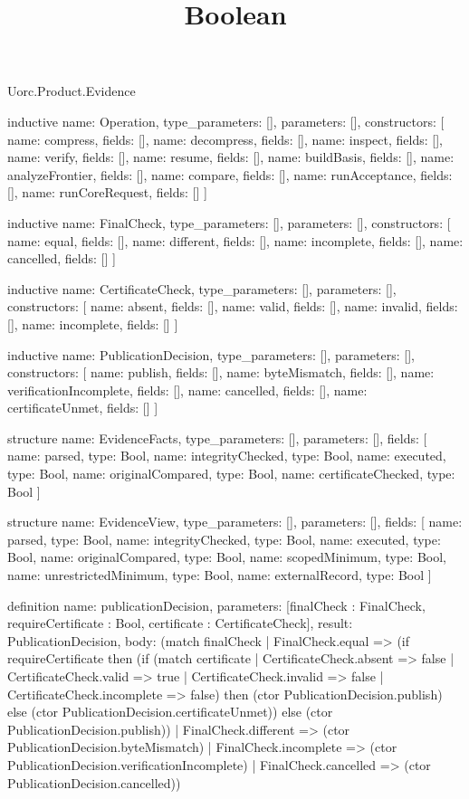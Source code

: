 \begin{lexlean}{Uorc.Product.Evidence}
\title{Boolean}
\begin{semanticmodule}
inductive{
  name: Operation,
  type_parameters: [],
  parameters: [],
  constructors: [
    {name: compress, fields: []},
    {name: decompress, fields: []},
    {name: inspect, fields: []},
    {name: verify, fields: []},
    {name: resume, fields: []},
    {name: buildBasis, fields: []},
    {name: analyzeFrontier, fields: []},
    {name: compare, fields: []},
    {name: runAcceptance, fields: []},
    {name: runCoreRequest, fields: []}
  ]
}

inductive{
  name: FinalCheck,
  type_parameters: [],
  parameters: [],
  constructors: [
    {name: equal, fields: []},
    {name: different, fields: []},
    {name: incomplete, fields: []},
    {name: cancelled, fields: []}
  ]
}

inductive{
  name: CertificateCheck,
  type_parameters: [],
  parameters: [],
  constructors: [
    {name: absent, fields: []},
    {name: valid, fields: []},
    {name: invalid, fields: []},
    {name: incomplete, fields: []}
  ]
}

inductive{
  name: PublicationDecision,
  type_parameters: [],
  parameters: [],
  constructors: [
    {name: publish, fields: []},
    {name: byteMismatch, fields: []},
    {name: verificationIncomplete, fields: []},
    {name: cancelled, fields: []},
    {name: certificateUnmet, fields: []}
  ]
}

structure{
  name: EvidenceFacts,
  type_parameters: [],
  parameters: [],
  fields: [
    {name: parsed, type: Bool},
    {name: integrityChecked, type: Bool},
    {name: executed, type: Bool},
    {name: originalCompared, type: Bool},
    {name: certificateChecked, type: Bool}
  ]
}

structure{
  name: EvidenceView,
  type_parameters: [],
  parameters: [],
  fields: [
    {name: parsed, type: Bool},
    {name: integrityChecked, type: Bool},
    {name: executed, type: Bool},
    {name: originalCompared, type: Bool},
    {name: scopedMinimum, type: Bool},
    {name: unrestrictedMinimum, type: Bool},
    {name: externalRecord, type: Bool}
  ]
}

definition{
  name: publicationDecision,
  parameters: [finalCheck : FinalCheck, requireCertificate : Bool, certificate : CertificateCheck],
  result: PublicationDecision,
  body: (match finalCheck
    | FinalCheck.equal => (if requireCertificate then (if (match certificate
      | CertificateCheck.absent => false
      | CertificateCheck.valid => true
      | CertificateCheck.invalid => false
      | CertificateCheck.incomplete => false) then (ctor PublicationDecision.publish) else (ctor PublicationDecision.certificateUnmet)) else (ctor PublicationDecision.publish))
    | FinalCheck.different => (ctor PublicationDecision.byteMismatch)
    | FinalCheck.incomplete => (ctor PublicationDecision.verificationIncomplete)
    | FinalCheck.cancelled => (ctor PublicationDecision.cancelled))
}


\end{semanticmodule}
\end{lexlean}

